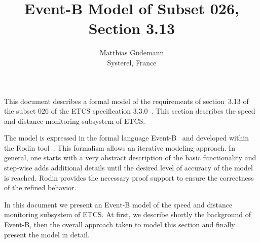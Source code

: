 \documentclass{template/openetcs_article}
\begin{document}
\frontmatter
{}





\newcommand{\true}{\ensuremath{true}}
\newcommand{\btext}[1]{{\it #1}}
\newcommand{\bvar}[1]{\btext{#1}}
\newcommand{\bevent}[1]{\btext{#1}}
\newcommand{\binv}[1]{\btext{#1}}
\newcommand{\bconst}[1]{\btext{#1}}
\newcommand{\bparam}[1]{\btext{#1}}
\newcommand{\bfunc}[1]{\btext{#1}}
\newcommand{\baxiom}[1]{\btext{#1}}
\newcommand{\btype}[1]{\btext{#1}}
\newcommand{\bguard}[1]{\btext{#1}}
\newcommand{\bmachine}[1]{\btext{#1}}
\newcommand{\bctx}[1]{\btext{#1}}

\author{Matthias Güdemann\\Systerel, France}


\title{Event-B Model of Subset 026, Section 3.13}




\maketitle
\tableofcontents
\listoffiguresandtables
\newpage

This document describes a formal model of the requirements of section~3.13 of
the subset 026 of the ETCS specification 3.3.0~\cite{SRS-026-330}. This section
describes the speed and distance monitoring subsystem of ETCS.

The model is expressed in the formal language Event-B~\cite{abrial-eventB-Book}
and developed within the Rodin tool~\cite{rodin-handbook}. This formalism allows
an iterative modeling approach. In general, one starts with a very abstract
description of the basic functionality and step-wise adds additional details
until the desired level of accuracy of the model is reached. Rodin provides the
necessary proof support to ensure the correctness of the refined behavior.

In this document we present an Event-B model of the speed and distance
monitoring subsystem of ETCS. At first, we describe shortly the background of
Event-B, then the overall approach taken to model this section and finally
present the model in detail.
\end{document}
